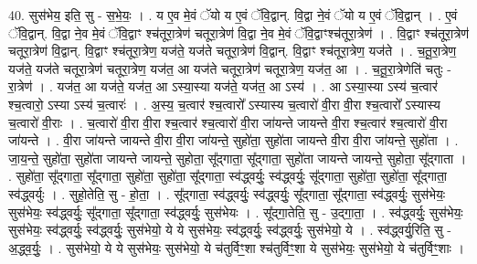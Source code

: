 \documentclass[17pt]{extarticle}
\begin{document}
40. सुस॑भेय॒ इति॒ सु - स॒भे॒यः॒ । . य ए॒व मे॒वं ॅयो य ए॒वं ॅवि॒द्वान्. वि॒द्वा ने॒वं ॅयो य ए॒वं ॅवि॒द्वान् । . ए॒वं ॅवि॒द्वान्. वि॒द्वा ने॒व मे॒वं ॅवि॒द्वाꣳ श्च॑तूरा॒त्रेण॑ चतूरा॒त्रेण॑ वि॒द्वा ने॒व मे॒वं ॅवि॒द्वाꣳश्च॑तूरा॒त्रेण॑ । . वि॒द्वाꣳ श्च॑तूरा॒त्रेण॑ चतूरा॒त्रेण॑ वि॒द्वान्. वि॒द्वाꣳ श्च॑तूरा॒त्रेण॒ यज॑ते॒ यज॑ते चतूरा॒त्रेण॑ वि॒द्वान्. वि॒द्वाꣳ श्च॑तूरा॒त्रेण॒ यज॑ते । . च॒तू॒रा॒त्रेण॒ यज॑ते॒ यज॑ते चतूरा॒त्रेण॑ चतूरा॒त्रेण॒ यज॑त॒ आ यज॑ते चतूरा॒त्रेण॑ चतूरा॒त्रेण॒ यज॑त॒ आ । . च॒तू॒रा॒त्रेणेति॑ चतुः - रा॒त्रेण॑ । . यज॑त॒ आ यज॑ते॒ यज॑त॒ आ ऽस्या॒स्या यज॑ते॒ यज॑त॒ आ ऽस्य॑ । . आ ऽस्या॒स्या ऽस्य॑ च॒त्वार॑ श्च॒त्वारो॒ ऽस्या ऽस्य॑ च॒त्वारः॑ । . अ॒स्य॒ च॒त्वार॑ श्च॒त्वारो᳚ ऽस्यास्य च॒त्वारो॑ वी॒रा वी॒रा श्च॒त्वारो᳚ ऽस्यास्य च॒त्वारो॑ वी॒राः । . च॒त्वारो॑ वी॒रा वी॒रा श्च॒त्वार॑ श्च॒त्वारो॑ वी॒रा जा॑यन्ते जायन्ते वी॒रा श्च॒त्वार॑ श्च॒त्वारो॑ वी॒रा जा॑यन्ते । . वी॒रा जा॑यन्ते जायन्ते वी॒रा वी॒रा जा॑यन्ते॒ सुहो॑ता॒ सुहो॑ता जायन्ते वी॒रा वी॒रा जा॑यन्ते॒ सुहो॑ता । . जा॒य॒न्ते॒ सुहो॑ता॒ सुहो॑ता जायन्ते जायन्ते॒ सुहोता॒ सू᳚द्‍गाता॒ सू᳚द्‍गाता॒ सुहो॑ता जायन्ते जायन्ते॒ सुहोता॒ सू᳚द्‍गाता । . सुहो॑ता॒ सू᳚द्‍गाता॒ सू᳚द्‍गाता॒ सुहो॑ता॒ सुहो॑ता॒ सू᳚द्‍गाता॒ स्व॑द्ध्वर्युः॒ स्व॑द्ध्वर्युः॒ सू᳚द्‍गाता॒ सुहो॑ता॒ सुहो॑ता॒ सू᳚द्‍गाता॒ स्व॑द्ध्वर्युः । . सुहो॒तेति॒ सु - हो॒ता॒ । . सू᳚द्‍गाता॒ स्व॑द्ध्वर्युः॒ स्व॑द्ध्वर्युः॒ सू᳚द्‍गाता॒ सू᳚द्‍गाता॒ स्व॑द्ध्वर्युः॒ सुस॑भेयः॒ सुस॑भेयः॒ स्व॑द्ध्वर्युः॒ सू᳚द्‍गाता॒ सू᳚द्‍गाता॒ स्व॑द्ध्वर्युः॒ सुस॑भेयः । . सू᳚द्‍गा॒तेति॒ सु - उ॒द्‍गा॒ता॒ । . स्व॑द्ध्वर्युः॒ सुस॑भेयः॒ सुस॑भेयः॒ स्व॑द्ध्वर्युः॒ स्व॑द्ध्वर्युः॒ सुस॑भेयो॒ ये ये सुस॑भेयः॒ स्व॑द्ध्वर्युः॒ स्व॑द्ध्वर्युः॒ सुस॑भेयो॒ ये । . स्व॑द्ध्वर्यु॒रिति॒ सु - अ॒द्ध्व॒र्युः॒ । . सुस॑भेयो॒ ये ये सुस॑भेयः॒ सुस॑भेयो॒ ये च॑तुर्विꣳ॒॒शा श्च॑तुर्विꣳ॒॒शा ये सुस॑भेयः॒ सुस॑भेयो॒ ये च॑तुर्विꣳ॒॒शाः । \newline
\end{document}
